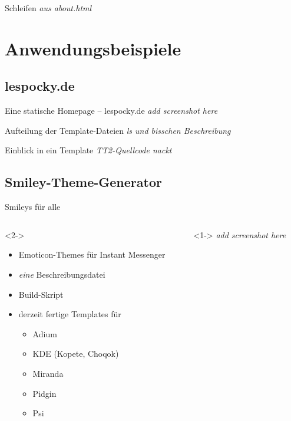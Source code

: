 \documentclass[hyperref={pdfpagelabels=false}]{beamer}
\begin{document}
\begin{frame}{Schleifen}
    \emph{aus about.html}
\end{frame}

\section{Anwendungsbeispiele}

\subsection{lespocky.de}

\begin{frame}{Eine statische Homepage -- lespocky.de}
    \emph{add screenshot here}
\end{frame}

\begin{frame}{Aufteilung der Template-Dateien}
    \emph{ls und bisschen Beschreibung}
\end{frame}

\begin{frame}{Einblick in ein Template}
    \emph{TT2-Quellcode nackt}
\end{frame}

\subsection{Smiley-Theme-Generator}

\begin{frame}{Smileys für alle}
    \begin{columns}
        \begin{column}{0.6\textwidth}<2->
            \begin{itemize}
                \item Emoticon-Themes für Instant Messenger
                \item \emph{eine} Beschreibungsdatei
                \item Build-Skript
                \item derzeit fertige Templates für
                    \begin{itemize}
                        \item Adium
                        \item KDE (Kopete, Choqok)
                        \item Miranda
                        \item Pidgin
                        \item Psi
                    \end{itemize}
            \end{itemize}
        \end{column}
        \begin{column}{0.4\textwidth}<1->
            \emph{add screenshot here}
        \end{column}
    \end{columns}
\end{frame}
\end{document}
